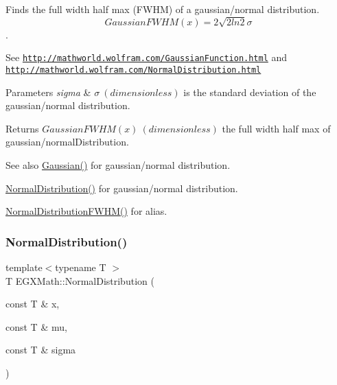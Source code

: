 Finds the full width half max (F\+W\+HM) of a gaussian/normal distribution. \[GaussianFWHM(x)=2\sqrt{2 ln 2} \sigma \]. 

See \href{http://mathworld.wolfram.com/GaussianFunction.html}{\tt http\+://mathworld.\+wolfram.\+com/\+Gaussian\+Function.\+html} and \href{http://mathworld.wolfram.com/NormalDistribution.html}{\tt http\+://mathworld.\+wolfram.\+com/\+Normal\+Distribution.\+html} 
\begin{DoxyParams}{Parameters}
{\em sigma} & $\sigma\ (dimensionless)$ is the standard deviation of the gaussian/normal distribution. \\
\hline
\end{DoxyParams}
\begin{DoxyReturn}{Returns}
$GaussianFWHM(x)\ (dimensionless)$ the full width half max of gaussian/normal\+Distribution. 
\end{DoxyReturn}
\begin{DoxySeeAlso}{See also}
\mbox{\hyperlink{group___g_x_math-_functions-_gaussian_ga647b46315081e299edc16a1c7f4e4032}{Gaussian()}} for gaussian/normal distribution. 

\mbox{\hyperlink{group___g_x_math-_functions-_gaussian_ga3747a7d047293d0e5310ba112bece627}{Normal\+Distribution()}} for gaussian/normal distribution. 

\mbox{\hyperlink{group___g_x_math-_functions-_gaussian_gac537b8c525932979b28101cf432bcc0f}{Normal\+Distribution\+F\+W\+H\+M()}} for alias. 
\end{DoxySeeAlso}
\mbox{\label{group___g_x_math-_functions-_gaussian_ga3747a7d047293d0e5310ba112bece627}} 
\subsubsection{\texorpdfstring{Normal\+Distribution()}{NormalDistribution()}}
{\footnotesize\ttfamily template$<$typename T $>$ \\
T E\+G\+X\+Math\+::\+Normal\+Distribution (\begin{DoxyParamCaption}\item[{const T \&}]{x,  }\item[{const T \&}]{mu,  }\item[{const T \&}]{sigma }\end{DoxyParamCaption})}



